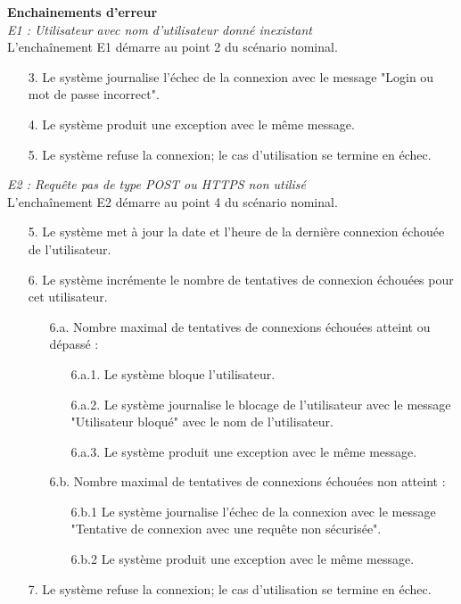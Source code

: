 \textbf{Enchainements d’erreur}\\
\textit{E1 : Utilisateur avec nom d'utilisateur donné inexistant}\\
L’enchaînement E1 démarre au point 2 du scénario nominal.
\begin{itemize}
	\item[3.] Le système journalise l'échec de la connexion avec le message "Login ou mot de passe incorrect".
	\item[4.] Le système produit une exception avec le même message.
	\item[5.] Le système refuse la connexion; le cas d'utilisation se termine en échec.
\end{itemize}
\textit{E2 : Requête pas de type POST ou HTTPS non utilisé}\\
L’enchaînement E2 démarre au point 4 du scénario nominal.
\begin{itemize}
	\item[5.] Le système met à jour la date et l'heure de la dernière connexion échouée de l'utilisateur.
	\item[6.] Le système incrémente le nombre de tentatives de connexion échouées pour cet utilisateur.
	\begin{itemize}
		\item[6.a.] Nombre maximal de tentatives de connexions échouées atteint ou dépassé : 
		\begin{itemize}
			\item[6.a.1.] Le système bloque l'utilisateur.
			\item[6.a.2.] Le système journalise le blocage de l'utilisateur avec le message "Utilisateur bloqué" avec le nom de l'utilisateur.
			\item[6.a.3.] Le système produit une exception avec le même message.
		\end{itemize}	
		\item[6.b.] Nombre maximal de tentatives de connexions échouées non atteint :
		\begin{itemize}
			\item[6.b.1] Le système journalise l'échec de la connexion avec le message "Tentative de connexion avec une requête non sécurisée".
			\item[6.b.2] Le système produit une exception avec le même message.
		\end{itemize}	
	\end{itemize}
	\item[7.] Le système refuse la connexion; le cas d'utilisation se termine en échec.
\end{itemize}
